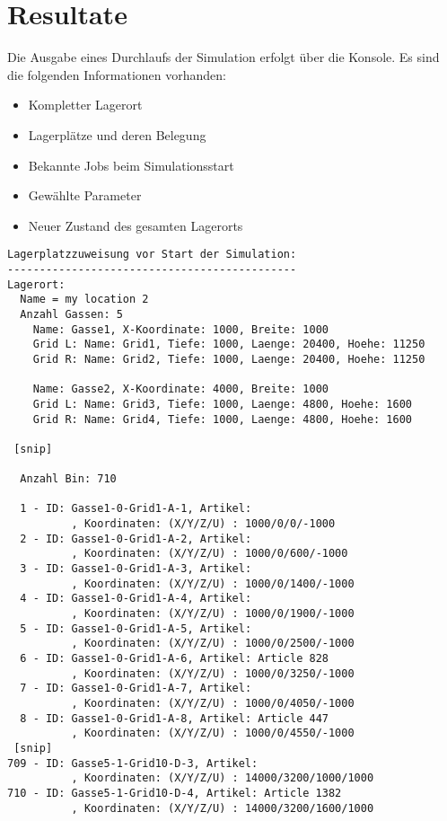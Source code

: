 \section{Resultate}
Die Ausgabe eines Durchlaufs der Simulation erfolgt über die Konsole. Es sind die folgenden Informationen vorhanden:
%
\begin{itemize}
  \item Kompletter Lagerort
  \item Lagerplätze und deren Belegung
  \item Bekannte Jobs beim Simulationsstart
  \item Gewählte Parameter
  \item Neuer Zustand des gesamten Lagerorts
\end{itemize}

\begin{verbatim}
Lagerplatzzuweisung vor Start der Simulation:
---------------------------------------------
Lagerort:
  Name = my location 2
  Anzahl Gassen: 5
    Name: Gasse1, X-Koordinate: 1000, Breite: 1000
    Grid L: Name: Grid1, Tiefe: 1000, Laenge: 20400, Hoehe: 11250
    Grid R: Name: Grid2, Tiefe: 1000, Laenge: 20400, Hoehe: 11250

    Name: Gasse2, X-Koordinate: 4000, Breite: 1000
    Grid L: Name: Grid3, Tiefe: 1000, Laenge: 4800, Hoehe: 1600
    Grid R: Name: Grid4, Tiefe: 1000, Laenge: 4800, Hoehe: 1600

 [snip]

  Anzahl Bin: 710

  1 - ID: Gasse1-0-Grid1-A-1, Artikel:            
          , Koordinaten: (X/Y/Z/U) : 1000/0/0/-1000
  2 - ID: Gasse1-0-Grid1-A-2, Artikel:            
          , Koordinaten: (X/Y/Z/U) : 1000/0/600/-1000
  3 - ID: Gasse1-0-Grid1-A-3, Artikel:            
          , Koordinaten: (X/Y/Z/U) : 1000/0/1400/-1000
  4 - ID: Gasse1-0-Grid1-A-4, Artikel:            
          , Koordinaten: (X/Y/Z/U) : 1000/0/1900/-1000
  5 - ID: Gasse1-0-Grid1-A-5, Artikel:            
          , Koordinaten: (X/Y/Z/U) : 1000/0/2500/-1000
  6 - ID: Gasse1-0-Grid1-A-6, Artikel: Article 828
          , Koordinaten: (X/Y/Z/U) : 1000/0/3250/-1000
  7 - ID: Gasse1-0-Grid1-A-7, Artikel:            
          , Koordinaten: (X/Y/Z/U) : 1000/0/4050/-1000
  8 - ID: Gasse1-0-Grid1-A-8, Artikel: Article 447
          , Koordinaten: (X/Y/Z/U) : 1000/0/4550/-1000
 [snip]
709 - ID: Gasse5-1-Grid10-D-3, Artikel:           
          , Koordinaten: (X/Y/Z/U) : 14000/3200/1000/1000
710 - ID: Gasse5-1-Grid10-D-4, Artikel: Article 1382
          , Koordinaten: (X/Y/Z/U) : 14000/3200/1600/1000


\end{verbatim}
